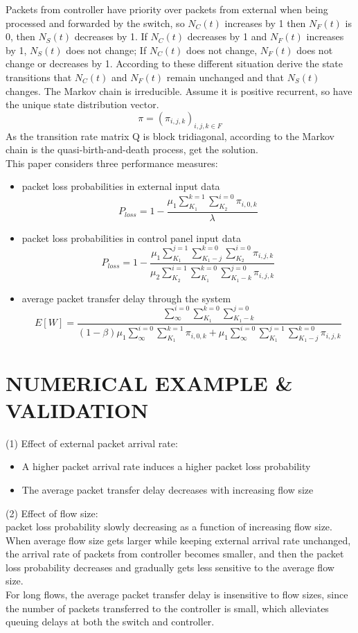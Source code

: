 \documentclass[12pt]{article}
\begin{document}
Packets from controller have priority over packets from external when being processed and forwarded by the switch, so $N_C(t)$ increases by 1 then $N_F(t)$ is 0, then $N_S(t) $ decreases by 1. If $N_C(t)$ decreases by 1 and $N_F(t)$ increases by 1, $N_S(t)$ does not change; If $N_C(t)$ does not change, $N_F(t)$ does not change or decreases by 1. According to these different situation derive the state transitions that $N_C(t)$ and $N_F(t)$ remain unchanged and that $N_S(t)$ changes. The Markov chain is irreducible. Assume it is positive recurrent, so have the unique state distribution vector.
$$ \pi = (\pi_{i,j,k})_{i,j,k\in F} $$
As the transition rate matrix Q is block tridiagonal, according to the Markov chain is the quasi-birth-and-death process, get the solution. \\
This paper considers three performance measures:
\begin{itemize}
\item packet loss probabilities in external input data
$$ P_{loss} = 1-\frac{\mu_1\sum_{K_1}^{k=1}\sum_{K_2}^{i=0}\pi_{i,0,k}}{\lambda} $$
\item packet loss probabilities in control panel input data
$$ P_{loss} = 1-\frac{\mu_1\sum_{K_1}^{j=1}\sum_{K_1-j}^{k=0}\sum_{K_2}^{i=0}\pi_{i,j,k}}{\mu_2\sum_{K_2}^{i=1}\sum_{K_1}^{k=0}\sum_{K_1-k}^{j=0}\pi_{i,j,k}} $$
\item average packet transfer delay through the system
$$ E[W] = \frac{\sum_{\infty}^{i=0}\sum_{K_1}^{k=0}\sum_{K_1-k}^{j=0}}{(1-\beta)\mu_1\sum_{\infty}^{i=0}\sum_{K_1}^{k=1}\pi_{i,0,k}+\mu_1\sum_{\infty}^{i=0}\sum_{K_1}^{j=1}\sum_{K_1-j}^{k=0}\pi_{i,j,k}} $$
\end{itemize}
\section*{NUMERICAL EXAMPLE \& VALIDATION}
(1) Effect of external packet arrival rate: 
\begin{itemize}
\item A higher packet arrival rate induces a higher packet loss probability 
\item The average packet transfer delay decreases with increasing flow size  
\end{itemize}
(2) Effect of flow size: \\
packet loss probability slowly decreasing as a function of increasing flow size. When average flow size gets larger while keeping external arrival rate unchanged, the arrival rate of packets from controller becomes smaller, and then the packet loss probability decreases and gradually gets less sensitive to the average flow size. \\
For long flows, the average packet transfer delay is insensitive to flow sizes, since the number of packets transferred to the controller is small, which alleviates queuing delays at both the switch and controller.
\end{document}
